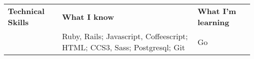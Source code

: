 \documentclass{pike-resume}
\begin{document}
\bluerule

\vspace{1em}

\begin{tabularx}{\textwidth}{p{} p{} p{}}
\textbf{\large Technical Skills} & \textbf{What I know} & \textbf{What I'm learning} \\
& Ruby, Rails; Javascript, Coffeescript; HTML; CCS3, Sass; Postgresql; Git
& Go 
\end{tabularx}
\end{document}
